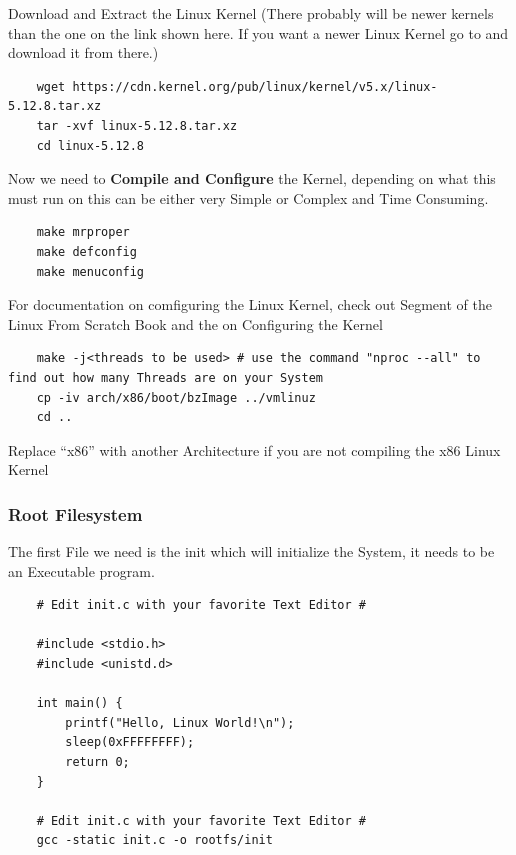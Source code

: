 \documentclass{article}
\begin{document}
			Download and Extract the Linux Kernel (There probably will be newer kernels than the one on the link shown here. If you want a newer Linux Kernel go to  and download it from there.)
			\begin{lstlisting}
	wget https://cdn.kernel.org/pub/linux/kernel/v5.x/linux-5.12.8.tar.xz
	tar -xvf linux-5.12.8.tar.xz
	cd linux-5.12.8
			\end{lstlisting}
			Now we need to \textbf{Compile and Configure} the Kernel, depending on what this must run on this can be either very Simple or Complex and Time Consuming.
			\begin{lstlisting}
	make mrproper
	make defconfig
	make menuconfig
			\end{lstlisting}
			For documentation on comfiguring the Linux Kernel, check out  Segment of the Linux From Scratch Book and the  on Configuring the Kernel
			\begin{lstlisting}
	make -j<threads to be used> # use the command "nproc --all" to find out how many Threads are on your System
	cp -iv arch/x86/boot/bzImage ../vmlinuz
	cd ..
			\end{lstlisting}
			Replace ``x86'' with another Architecture if you are not compiling the x86 Linux Kernel
		\subsubsection{Root Filesystem}
			The first File we need is the init which will initialize the System, it needs to be an Executable program.
			\begin{lstlisting}
	# Edit init.c with your favorite Text Editor #
	
	#include <stdio.h>
	#include <unistd.d>

	int main() {
		printf("Hello, Linux World!\n");
		sleep(0xFFFFFFFF);
		return 0;
	}

	# Edit init.c with your favorite Text Editor #
	gcc -static init.c -o rootfs/init
			\end{lstlisting}
\end{document}

